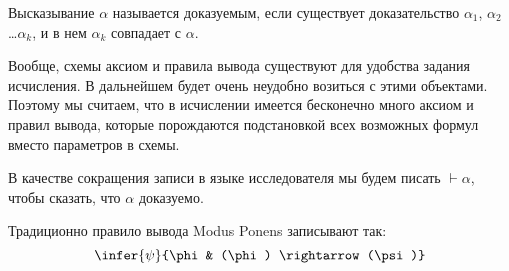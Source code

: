 \begin{definition} Высказывание $\alpha$ называется доказуемым, если 
существует доказательство $\alpha_1$, $\alpha_2$ \dots $\alpha_k$, и в нем
$\alpha_k$ совпадает с $\alpha$. 
\end{definition}

Вообще, схемы аксиом и правила вывода существуют для удобства задания
исчисления. В дальнейшем будет очень неудобно возиться с этими объектами.
Поэтому мы считаем, что в исчислении имеется бесконечно много аксиом и правил вывода,
которые порождаются подстановкой всех возможных формул вместо параметров в схемы.

В качестве сокращения записи в языке исследователя мы будем писать $\vdash \alpha$,
чтобы сказать, что $\alpha$ доказуемо.

Традиционно правило вывода Modus Ponens записывают так:
$$\infer{\psi}{\phi & (\phi) \rightarrow (\psi)}$$
